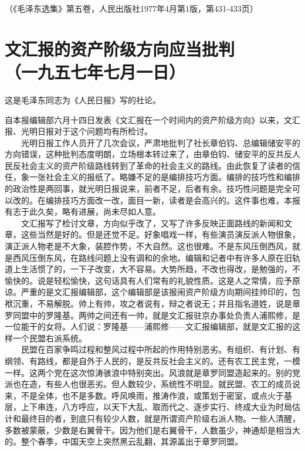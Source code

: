 \documentclass[cn,11pt,chinese]{elegantbook}
\def\myformat#1{\hfil\hfil #1}
\begin{document}
\begin{flushright}（《毛泽东选集》第五卷，人民出版社1977年4月第1版，第431-433页）\end{flushright}
\newpage\section*{\myformat{文汇报的资产阶级方向应当批判}\\\myformat{（一九五七年七月一日）}}
\begin{introduction}\item  这是毛泽东同志为《人民日报》写的社论。\end{introduction}
自本报编辑部六月十四日发表《文汇报在一个时间内的资产阶级方向》以来，文汇报、光明日报对于这个问题均有所检讨。\\
　　光明日报工作人员开了几次会议，严肃地批判了社长章伯钧、总编辑储安平的方向错误，这种批判态度明朗，立场根本转过来了，由章伯钧、储安平的反共反人民反社会主义的资产阶级路线转到了革命的社会主义的路线。由此恢复了读者的信任，象一张社会主义的报纸了。略嫌不足的是编排技巧方面。编排的技巧性和编排的政治性是两回事，就光明日报说来，前者不足，后者有余。技巧性问题是完全可以改的。在编排技巧方面改一改，面目一新，读者是会高兴的。这件事也难，本报有志于此久矣，略有进展，尚未尽如人意。\\
　　文汇报写了检讨文章，方向似乎改了，又写了许多反映正面路线的新闻和文章，这些当然是好的。但是还觉不足。好象唱戏一样，有些演员演反派人物很象，演正派人物老是不大象，装腔作势，不大自然。这也很难。不是东风压倒西风，就是西风压倒东风，在路线问题上没有调和的余地。编辑和记者中有许多人原在旧轨道上生活惯了的，一下子改变，大不容易。大势所趋，不改也得改，是勉强的，不愉快的。说是轻松愉快，这句话具有人们常有的礼貌性质。这是人之常情，应予原谅。严重的是文汇报编辑部，这个编辑部是该报闹资产阶级方向期间挂帅印的，包袱沉重，不易解脱。帅上有帅，攻之者说有，辩之者说无；并且指名道姓，说是章罗同盟中的罗隆基。两帅之间还有一帅，就是文汇报驻京办事处负责人浦熙修，是一位能干的女将。人们说：罗隆基——浦熙修——文汇报编辑部，就是文汇报的这样一个民盟右派系统。\\
　　民盟在百家争鸣过程和整风过程中所起的作用特别恶劣。有组织、有计划、有纲领、有路线，都是自外于人民的，是反共反社会主义的。还有农工民主党，一模一样。这两个党在这次惊涛骇浪中特别突出。风浪就是章罗同盟造起来的。别的党派也在造，有些人也很恶劣。但人数较少，系统性不明显。就民盟、农工的成员说来，不是全体，也不是多数。呼风唤雨，推涛作浪，或策划于密室，或点火于基层，上下串连，八方呼应，以天下大乱、取而代之、逐步实行、终成大业为时局估计和最终目的者，到底只有较少人数，就是所谓资产阶级右派人物。一些人清醒，多数被蒙蔽，少数是右翼骨干。因为他们是右翼骨干，人数虽少，神通却是相当大的。整个春季，中国天空上突然黑云乱翻，其源盖出于章罗同盟。\\
\end{document}
